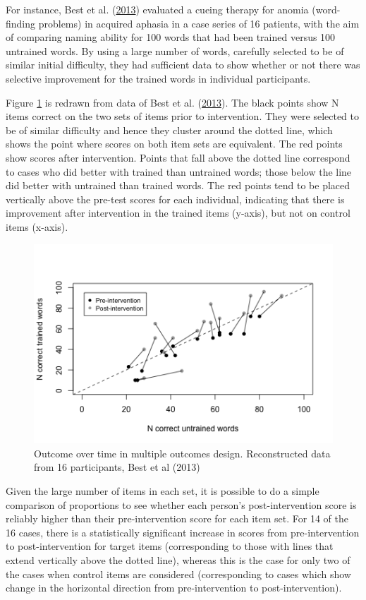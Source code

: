 \documentclass{krantz}
\begin{document}
For instance, Best et al. (\protect\hyperlink{ref-best2013}{2013}) evaluated a cueing therapy for anomia (word-finding problems) in acquired aphasia in a case series of 16 patients, with the aim of comparing naming ability for 100 words that had been trained versus 100 untrained words. By using a large number of words, carefully selected to be of similar initial difficulty, they had sufficient data to show whether or not there was selective improvement for the trained words in individual participants.

Figure \ref{fig:bestplot} is redrawn from data of Best et al. (\protect\hyperlink{ref-best2013}{2013}). The black points show N items correct on the two sets of items prior to intervention. They were selected to be of similar difficulty and hence they cluster around the dotted line, which shows the point where scores on both item sets are equivalent. The red points show scores after intervention. Points that fall above the dotted line correspond to cases who did better with trained than untrained words; those below the line did better with untrained than trained words. The red points tend to be placed vertically above the pre-test scores for each individual, indicating that there is improvement after intervention in the trained items (y-axis), but not on control items (x-axis).

\begin{figure}
\includegraphics[width=0.75\linewidth]{images_bw/bestplot} \caption{Outcome over time in multiple outcomes design. Reconstructed data from 16 participants, Best et al (2013)}\label{fig:bestplot}
\end{figure}

Given the large number of items in each set, it is possible to do a simple comparison of proportions to see whether each person's post-intervention score is reliably higher than their pre-intervention score for each item set. For 14 of the 16 cases, there is a statistically significant increase in scores from pre-intervention to post-intervention for target items (corresponding to those with lines that extend vertically above the dotted line), whereas this is the case for only two of the cases when control items are considered (corresponding to cases which show change in the horizontal direction from pre-intervention to post-intervention).
\end{document}
